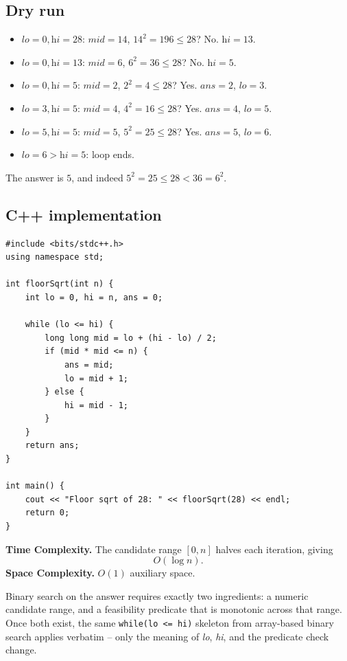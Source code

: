 \subsection*{Dry run}


\begin{itemize}
  \item $\textit{lo}=0,\textit{hi}=28$: $\textit{mid}=14$, $14^2=196 \le
        28$? No. $\textit{hi}=13$.
  \item $\textit{lo}=0,\textit{hi}=13$: $\textit{mid}=6$, $6^2=36 \le 28$?
        No. $\textit{hi}=5$.
  \item $\textit{lo}=0,\textit{hi}=5$: $\textit{mid}=2$, $2^2=4 \le 28$?
        Yes. $\textit{ans}=2$, $\textit{lo}=3$.
  \item $\textit{lo}=3,\textit{hi}=5$: $\textit{mid}=4$, $4^2=16 \le 28$?
        Yes. $\textit{ans}=4$, $\textit{lo}=5$.
  \item $\textit{lo}=5,\textit{hi}=5$: $\textit{mid}=5$, $5^2=25 \le 28$?
        Yes. $\textit{ans}=5$, $\textit{lo}=6$.
  \item $\textit{lo}=6 > \textit{hi}=5$: loop ends.
\end{itemize}

The answer is $5$, and indeed $5^2 = 25 \le 28 < 36 = 6^2$.

\subsection*{C++ implementation}

\begin{lstlisting}
#include <bits/stdc++.h>
using namespace std;

int floorSqrt(int n) {
    int lo = 0, hi = n, ans = 0;

    while (lo <= hi) {
        long long mid = lo + (hi - lo) / 2;
        if (mid * mid <= n) {
            ans = mid;
            lo = mid + 1;
        } else {
            hi = mid - 1;
        }
    }
    return ans;
}

int main() {
    cout << "Floor sqrt of 28: " << floorSqrt(28) << endl;
    return 0;
}
\end{lstlisting}

\begin{complexitybox}
\textbf{Time Complexity.} The candidate range $[0, n]$ halves each
iteration, giving
\[
  O(\log n).
\]
\textbf{Space Complexity.} $O(1)$ auxiliary space.
\end{complexitybox}

\begin{takeawaybox}
Binary search on the answer requires exactly two ingredients: a numeric
candidate range, and a feasibility predicate that is monotonic across that
range. Once both exist, the same \texttt{while(lo <= hi)} skeleton from
array-based binary search applies verbatim -- only the meaning of
\textit{lo}, \textit{hi}, and the predicate check change.
\end{takeawaybox}
